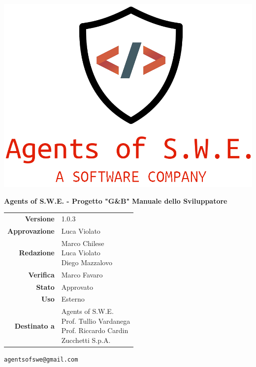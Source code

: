 


\begin{titlepage}
\thispagestyle{empty}

\begin{center}

\includegraphics[scale=0.3]{./images/logo.png} 

\large \textbf{Agents of S.W.E. - Progetto "G\&B"}
\vfill
\Huge \textbf{Manuale dello Sviluppatore}
\vfill
\large
\renewcommand{\arraystretch}{1.3}
\begin{tabular}{r|l}
\textbf{Versione} & 1.0.3\\
\textbf{Approvazione} & Luca Violato \\
\textbf{Redazione} & \parbox[t]{5cm}{Marco Chilese\\Luca Violato\\Diego Mazzalovo}\\
\textbf{Verifica} & \parbox[t]{5cm}{Marco Favaro}\\
\textbf{Stato} & Approvato\\
\textbf{Uso} & Esterno\\
\textbf{Destinato a} & \parbox[t]{5cm}{Agents of S.W.E. \\Prof. Tullio Vardanega\\Prof. Riccardo Cardin \\ Zucchetti S.p.A.}
\end{tabular}
\vfill
\small
\texttt{agentsofswe@gmail.com}
\end{center}
\end{titlepage}

\pagebreak

